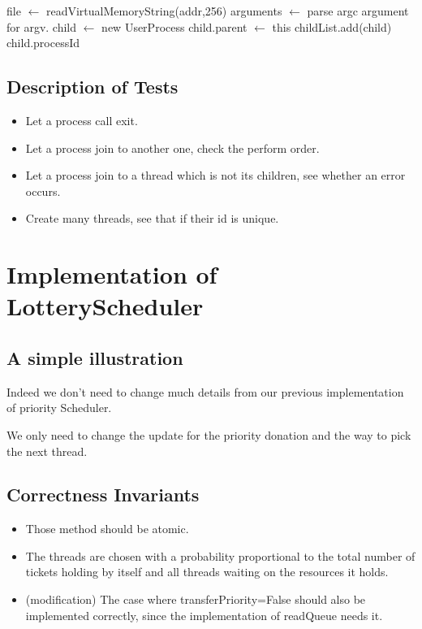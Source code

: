 \documentclass{article}
\begin{document}
	\begin{algorithm}[H]
		\begin{algorithmic}
			\State {}
			\EndIf
			\State file $\leftarrow$ readVirtualMemoryString(addr,256)
			\State {}
			\EndIf
			\State arguments $\leftarrow$ parse argc argument for argv.
			\State {}
			\EndIf
			\State child $\leftarrow$ new UserProcess
			\State child.parent $\leftarrow$ this
			\State childList.add(child)
			\State \Return child.processId
			\Else
			\State {}
			\EndIf
			\EndProcedure
		\end{algorithmic}
	\end{algorithm}
	
	\subsection{Description of Tests}
	\begin{itemize}
		\item Let a process call exit.
		\item Let a process join to another one, check the perform order.
		\item Let a process join to a thread which is not its children, see whether an error occurs.
		\item Create many threads, see that if their id is unique.
	\end{itemize}
	\section{Implementation of LotteryScheduler}
	\subsection{A simple illustration}
	Indeed we don't need to change much details from our previous implementation of priority Scheduler.
	
	We only need to change the update for the priority donation and the way to pick the next thread.
	
	\subsection{Correctness Invariants}
	\begin{itemize}
		\item Those method should be atomic.
		\item The threads are chosen with a probability proportional to the total number of tickets holding by itself and all threads waiting on the resources it holds.
		\item (modification) The case where transferPriority=False should also be implemented correctly, since the implementation of readQueue needs it.
	\end{itemize}
	
\end{document}
